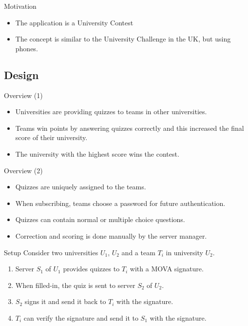 \documentclass{beamer}
\newlength{\wideitemsep}
\let\olditem\item
\renewcommand{\item}{\setlength{\itemsep}{\wideitemsep}\olditem}
\begin{document}
\begin{frame}{Motivation}
    \begin{itemize}
        \pause \item The application is a University Contest
        \pause \item The concept is similar to the University Challenge in the UK, but using phones.
    \end{itemize}

\end{frame}

\subsection{Design}
\begin{frame}{Overview (1)}
    \begin{itemize}
            \pause\item Universities are providing quizzes to teams in other universities.
            \pause\item Teams win points by answering quizzes correctly and this increased the final score of their university. 
            \pause\item The university with the highest score wins the contest.
    \end{itemize}
\end{frame}

\begin{frame}{Overview (2)}
    \begin{itemize}
        \pause \item Quizzes are uniquely assigned to the teams.    
        \pause \item When subscribing, teams choose a password for future authentication.
        \pause \item Quizzes can contain normal or multiple choice questions.
        \pause \item Correction and scoring is done manually by the server manager.
    \end{itemize}
\end{frame}

\begin{frame}{Setup}
    Consider two universities $U_1$, $U_2$ and a team $T_i$ in university $U_2$.
    \begin{enumerate}
            \pause\item Server $S_1$ of $U_1$ provides quizzes to $T_i$ with a MOVA signature.
            \pause\item When filled-in, the quiz is sent to server $S_2$ of $U_2$.
            \pause\item $S_2$ signs it and send it back to $T_i$ with the signature.
            \pause\item $T_i$ can verify the signature and send it to $S_1$ with the signature.
    \end{enumerate}
\end{frame}
\end{document}
